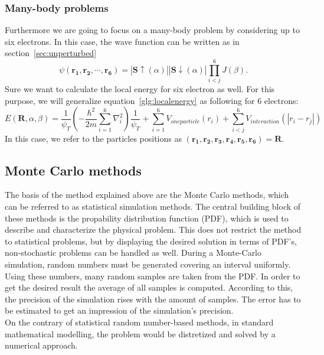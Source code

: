 \subsubsection{Many-body problems}
Furthermore we are going to focus on a many-body problem by considering up to six electrons. In this case, the wave function can be written as in section~\ref{sec:unperturbed}
\begin{equation}\label{glg:sixelectron}
\psi(\mathbf{r_1,r_2,\cdots, r_6})= |\mathbf{S\uparrow}(\alpha)||\mathbf{S\downarrow}(\alpha)|\prod_{i<j}^6 J(\beta).
\end{equation}
Sure we want to calculate the local energy for six electron as well. For this purpose, we will generalize equation~\ref{glg:localenergy} as following for $6$ electrons:
\begin{equation}
E(\mathbf{R},\alpha,\beta) = \frac{1}{\psi_T} \left(-\frac{\hbar^2}{2m}\sum_{i=1}^6 \nabla^2_i\right) \frac{1}{\psi_T} + \sum_{i=1}^6 V_{oneparticle}(r_i) + \sum_{i<j}^6 V_{interaction}(|r_i-r_j|)
\end{equation}
In this case, we refer to the particles positions as $(\mathbf{r_1,r_2,r_3,r_4,r_5,r_6})=\mathbf{R}$.
\subsection{Monte Carlo methods}
The basis of the method explained above are the Monte Carlo methods, which can be referred to as statistical simulation methods. The central building block of these methods is the propability distribution function (PDF), which is used to describe and characterize the physical problem. This does not restrict the method to statistical problems, but by displaying the desired solution in terms of PDF's, non-stochastic problems can be handled as well. During a Monte-Carlo simulation, random numbers must be generated covering an interval uniformly. Using these numbers, many random samples are taken from the PDF. In order to get the desired result the average of all samples is computed. According to this, the precision of the simulation rises with the amount of samples. The error has to be estimated to get an impression of the simulation's precision.\\
On the contrary of statistical random number-based methods, in standard mathematical modelling, the problem would be distretized and solved by a numerical approach.\\
